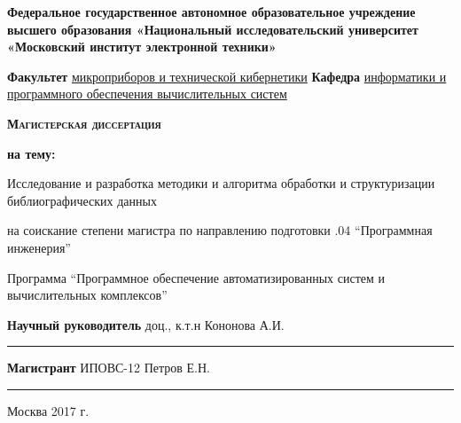 \newpage

\begin{center}
{\small \textbf{Федеральное государственное автономное образовательное учреждение высшего образования
«Национальный исследовательский университет «Московский институт электронной техники»}}
\end{center}

\begin{flushleft}
{\small \textbf{Факультет} \underline{микроприборов и технической кибернетики}} \linebreak
{\small \textbf{Кафедра} \underline{информатики и программного обеспечения вычислительных систем}}
\end{flushleft}

\vspace{1em}

\begin{center}
\textsc{\textbf{Магистерская диссертация}}
\end{center}

\begin{center}
\textbf{на тему:}
\end{center}

\vspace{1.0em}

\begin{center}
Исследование и разработка методики и алгоритма обработки и структуризации библиографических данных
\end{center}

\vspace{1em}

\begin{center}
на соискание степени магистра по направлению подготовки .04 “Программная инженерия”
\end{center}

\begin{center}
Программа “Программное обеспечение автоматизированных систем и \linebreak
вычислительных комплексов”
\end{center}

\vspace{\fill}

\begin{flushright}
\textbf{Научный руководитель} доц., к.т.н \linebreak
Кононова А.И. \linebreak
\rule{5cm}{.1pt}

\vspace{1em}

\textbf{Магистрант} ИПОВС-12 \linebreak
Петров Е.Н. \linebreak
\rule{5cm}{.1pt}
\end{flushright}

\begin{center}
Москва 2017 г.
\end{center}

\thispagestyle{empty}